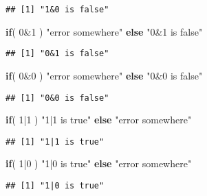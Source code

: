 \documentclass[
]{article}
\newenvironment{Shaded}{\begin{snugshade}}{\end{snugshade}}
\newcommand{\ControlFlowTok}[1]{\textcolor[rgb]{0.13,0.29,0.53}{\textbf{#1}}}
\newcommand{\DecValTok}[1]{\textcolor[rgb]{0.00,0.00,0.81}{#1}}
\newcommand{\NormalTok}[1]{#1}
\newcommand{\SpecialCharTok}[1]{\textcolor[rgb]{0.00,0.00,0.00}{#1}}
\newcommand{\StringTok}[1]{\textcolor[rgb]{0.31,0.60,0.02}{#1}}
\begin{document}
\begin{verbatim}
## [1] "1&0 is false"
\end{verbatim}

\begin{Shaded}
\begin{Highlighting}[]
\ControlFlowTok{if}\NormalTok{( }\DecValTok{0}\SpecialCharTok{\&}\DecValTok{1}\NormalTok{ ) }\StringTok{"error somewhere"} \ControlFlowTok{else} \StringTok{"0\&1 is false"}
\end{Highlighting}
\end{Shaded}

\begin{verbatim}
## [1] "0&1 is false"
\end{verbatim}

\begin{Shaded}
\begin{Highlighting}[]
\ControlFlowTok{if}\NormalTok{( }\DecValTok{0}\SpecialCharTok{\&}\DecValTok{0}\NormalTok{ ) }\StringTok{"error somewhere"} \ControlFlowTok{else} \StringTok{"0\&0 is false"}
\end{Highlighting}
\end{Shaded}

\begin{verbatim}
## [1] "0&0 is false"
\end{verbatim}

\begin{Shaded}
\begin{Highlighting}[]
\ControlFlowTok{if}\NormalTok{( }\DecValTok{1}\SpecialCharTok{|}\DecValTok{1}\NormalTok{ ) }\StringTok{"1|1 is true"} \ControlFlowTok{else} \StringTok{"error somewhere"}
\end{Highlighting}
\end{Shaded}

\begin{verbatim}
## [1] "1|1 is true"
\end{verbatim}

\begin{Shaded}
\begin{Highlighting}[]
\ControlFlowTok{if}\NormalTok{( }\DecValTok{1}\SpecialCharTok{|}\DecValTok{0}\NormalTok{ ) }\StringTok{"1|0 is true"} \ControlFlowTok{else} \StringTok{"error somewhere"}
\end{Highlighting}
\end{Shaded}

\begin{verbatim}
## [1] "1|0 is true"
\end{verbatim}
\end{document}
